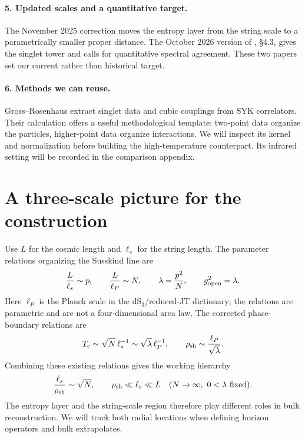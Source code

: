 \documentclass[11pt,a4paper]{article}
\begin{document}
\paragraph{5. Updated scales and a quantitative target.}
The November 2025 correction \cite{correction} moves the entropy layer
from the string scale to a parametrically smaller proper distance.
The October 2026 version of \cite{mss26}, \S4.3, gives the singlet
tower and calls for quantitative spectral agreement. These two papers
set our current rather than historical target.

\paragraph{6. Methods we can reuse.}
Gross--Rosenhaus \cite{gr} extract singlet data and cubic couplings
from SYK correlators. Their calculation offers a useful methodological
template: two-point data organize the particles, higher-point data
organize interactions. We will inspect its kernel and normalization
before building the high-temperature counterpart. Its infrared setting
will be recorded in the comparison appendix.

\newpage
\section{A three-scale picture for the construction}
Use $L$ for the cosmic length and $\ell_s$ for the string length.
The parameter relations organizing the Susskind line are
\begin{equation}
 \frac{L}{\ell_s}\sim p,\qquad
 \frac{L}{\ell_P}\sim N,\qquad
 \lambda=\frac{p^2}{N},\qquad g_{\rm open}^2=\lambda.
\end{equation}
Here $\ell_P$ is the Planck scale in the dS$_3$/reduced-JT dictionary;
the relations are parametric and are not a four-dimensional area law.
The corrected phase-boundary relations \cite{correction} are
\begin{equation}
 T_c\sim \sqrt N\,\ell_s^{-1}
       \sim\sqrt\lambda\,\ell_P^{-1},\qquad
 \rho_{\rm sh}\sim \frac{\ell_P}{\sqrt\lambda}.
\end{equation}
Combining these existing relations gives the working hierarchy
\begin{equation}
 \frac{\ell_s}{\rho_{\rm sh}}\sim\sqrt N,\qquad
 \rho_{\rm sh}\ll\ell_s\ll L
 \quad(N\to\infty,\ 0<\lambda\text{ fixed}).\label{hierarchy}
\end{equation}
The entropy layer and the string-scale region therefore play different
roles in bulk reconstruction. We will track both radial locations when
defining horizon operators and bulk extrapolates.
\end{document}

